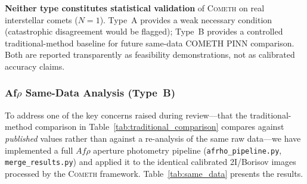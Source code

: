 \documentclass[usenatbib]{mnras}
\begin{document}
\noindent\textbf{Neither type constitutes statistical validation} of \textsc{Cometh} on real interstellar comets ($N=1$). Type~A provides a weak necessary condition (catastrophic disagreement would be flagged); Type~B provides a controlled traditional-method baseline for future same-data COMETH PINN comparison. Both are reported transparently as feasibility demonstrations, not as calibrated accuracy claims.

\subsubsection{Af$\rho$ Same-Data Analysis (Type~B)}\label{sec:same_data}

To address one of the key concerns raised during review---that the traditional-method comparison in Table~\ref{tab:traditional_comparison} compares against \textit{published} values rather than against a re-analysis of the same raw data---we have implemented a full $Af\rho$ aperture photometry pipeline (\texttt{afrho\_pipeline.py}, \texttt{merge\_results.py}) and applied it to the identical calibrated 2I/Borisov images processed by the \textsc{Cometh} framework. Table~\ref{tab:same_data} presents the results.
\end{document}
